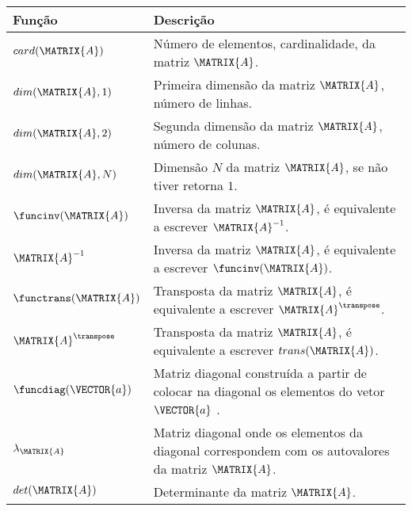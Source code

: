 \begin{notation}~\\
\begin{tabular}{p{} |  p{} }
\hline	
\textbf{Função} & \textbf{Descrição} \\ \hline
$card(\MATRIX{A})$ & Número de elementos, cardinalidade, da matriz $\MATRIX{A}$. \\
\hline
$dim(\MATRIX{A},1)$ & Primeira dimensão da matriz $\MATRIX{A}$, número de linhas. \\
$dim(\MATRIX{A},2)$ & Segunda dimensão da matriz $\MATRIX{A}$, número de colunas. \\
$dim(\MATRIX{A},N)$ & Dimensão $N$ da matriz $\MATRIX{A}$, se não tiver retorna $1$. \\
\hline
$\funcinv(\MATRIX{A})$ & Inversa da matriz $\MATRIX{A}$, é equivalente a escrever $\MATRIX{A}^{-1}$. \\
$\MATRIX{A}^{-1}$ & Inversa da matriz $\MATRIX{A}$, é equivalente a escrever $\funcinv(\MATRIX{A})$. \\
\hline
$\functrans(\MATRIX{A})$ & Transposta da matriz $\MATRIX{A}$, é equivalente a escrever $\MATRIX{A}^{\transpose}$. \\
$\MATRIX{A}^{\transpose}$ & Transposta da matriz $\MATRIX{A}$, é equivalente a escrever $trans(\MATRIX{A})$. \\
\hline
$\funcdiag(\VECTOR{a})$ & Matriz diagonal construída a partir de colocar na diagonal os elementos do vetor $\VECTOR{a}$ . \\
\hline
$\lambda_{\MATRIX{A}}$ & Matriz diagonal onde os elementos da diagonal correspondem com os autovalores da matriz $\MATRIX{A}$. \\
\hline
$det(\MATRIX{A})$ & Determinante da matriz $\MATRIX{A}$. \\
\hline
\end{tabular}
\end{notation}


